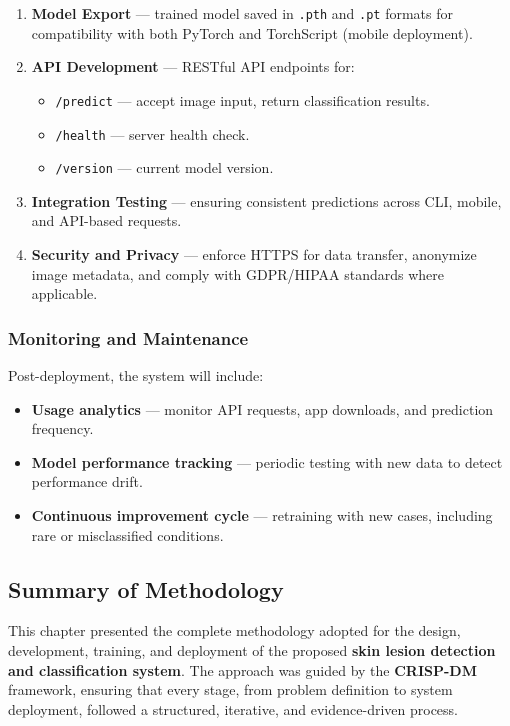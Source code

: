 \documentclass[
  12pt,
  oneside]{article}
\providecommand{\tightlist}{%
  \setlength{\itemsep}{0pt}\setlength{\parskip}{0pt}}
\begin{document}
\begin{enumerate}
\def\labelenumi{\arabic{enumi}.}
\item
  \textbf{Model Export} --- trained model saved in \texttt{.pth} and
  \texttt{.pt} formats for compatibility with both PyTorch and
  TorchScript (mobile deployment).
\item
  \textbf{API Development} --- RESTful API endpoints for:

  \begin{itemize}
  \tightlist
  \item
    \texttt{/predict} --- accept image input, return classification
    results.
  \item
    \texttt{/health} --- server health check.
  \item
    \texttt{/version} --- current model version.
  \end{itemize}
\item
  \textbf{Integration Testing} --- ensuring consistent predictions
  across CLI, mobile, and API-based requests.
\item
  \textbf{Security and Privacy} --- enforce HTTPS for data transfer,
  anonymize image metadata, and comply with GDPR/HIPAA standards where
  applicable.
\end{enumerate}

\subsubsection{Monitoring and
Maintenance}\label{monitoring-and-maintenance}

Post-deployment, the system will include:

\begin{itemize}
\tightlist
\item
  \textbf{Usage analytics} --- monitor API requests, app downloads, and
  prediction frequency.
\item
  \textbf{Model performance tracking} --- periodic testing with new data
  to detect performance drift.
\item
  \textbf{Continuous improvement cycle} --- retraining with new cases,
  including rare or misclassified conditions.
\end{itemize}

\subsection{Summary of Methodology}\label{summary-of-methodology}

This chapter presented the complete methodology adopted for the design,
development, training, and deployment of the proposed \textbf{skin
lesion detection and classification system}. The approach was guided by
the \textbf{CRISP-DM} framework, ensuring that every stage, from problem
definition to system deployment, followed a structured, iterative, and
evidence-driven process.
\end{document}
